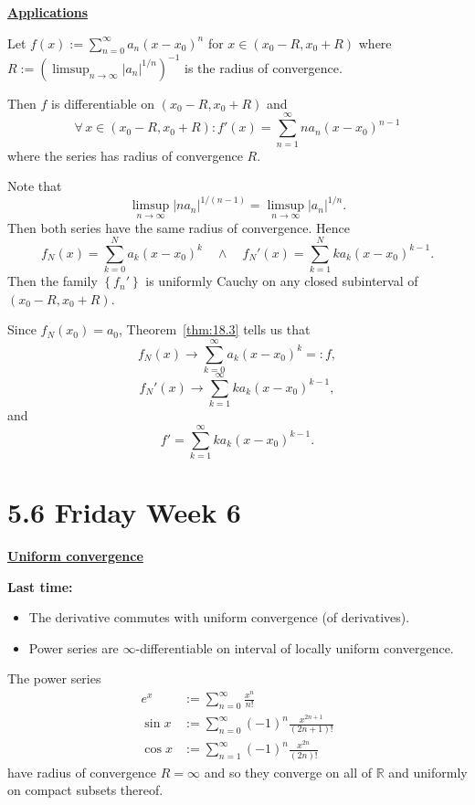 \documentclass{notes}
\begin{document}
  {\boldmath \bfseries \underline{Applications}}

  \begin{lem}
    Let $f(x) := \sum_{n = 0}^\infty a_n (x - x_0)^n$ for $x \in (x_0 - R, x_0 + R)$ where $R := (\limsup_{n \to \infty} \left | a_n \right |^{1 / n})^{-1}$ is the radius of convergence.
    
    Then $f$ is differentiable on $(x_0 - R, x_0 + R)$ and 
    \[
      \forall \, x \in (x_0 - R, x_0 + R): f'(x) = \sum_{n = 1}^\infty n a_n (x - x_0)^{n - 1}
    \]
    where the series has radius of convergence $R$.
  \end{lem}
  
  \begin{prf}
    Note that 
    \[
      \limsup_{n \to \infty} \left | n a_n \right |^{1 / (n - 1)} = \limsup_{n \to \infty} \left | a_n \right |^{1 / n}.
    \]
    Then both series have the same radius of convergence.
    Hence 
    \[
      f_N(x) = \sum_{k = 0}^N a_k (x - x_0)^k \quad \land \quad f_N'(x) = \sum_{k = 1}^N k a_k (x - x_0)^{k - 1}.
    \]
    Then the family $\left \{ f_n' \right \}$ is uniformly Cauchy on any closed subinterval of $(x_0 - R, x_0 + R)$.
    
    Since $f_N(x_0) = a_0$, Theorem~\ref{thm:18.3} tells us that 
    \[
      f_N(x) \to \sum_{k = 0}^\infty a_k (x - x_0)^k =: f, 
    \]
    \[
      f_N'(x) \to \sum_{k = 1}^\infty k a_k (x - x_0)^{k - 1}, 
    \]
    and 
    \[
      f' = \sum_{k = 1}^\infty k a_k (x - x_0)^{k - 1}.
    \]
  \end{prf}
  
  \newpage
  
  \section{5.6 Friday Week 6}
  
  {\boldmath \bfseries \underline{Uniform convergence}}

  {\boldmath \bfseries Last time:} 
  \begin{itemize}
    \item The derivative commutes with uniform convergence (of derivatives).
      
    \item Power series are $\infty$-differentiable on interval of locally uniform convergence.
  \end{itemize}
  
  \begin{lem}
    The power series
    \begin{align*}
      e^x &:= \sum_{n = 0}^\infty \frac{x^n}{n!} \\ 
      \sin x &:= \sum_{n = 0}^\infty (-1)^n \frac{x^{2 n + 1}}{(2 n + 1)!} \\ 
      \cos x &:= \sum_{n = 1}^\infty (-1)^n \frac{x^{2 n}}{(2 n)!}
    \end{align*}
    have radius of convergence $R = \infty$ and so they converge on all of $\mathbb R$ and uniformly on compact subsets thereof.
  \end{lem}
  
\end{document}
